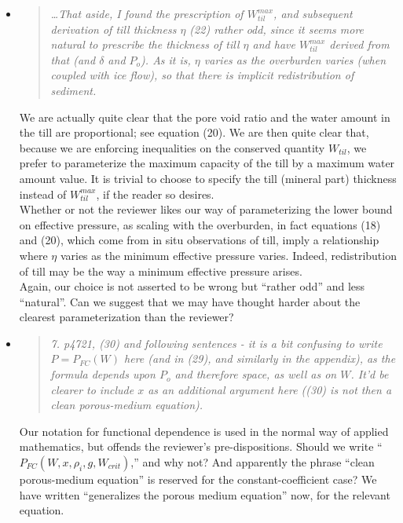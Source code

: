 \documentclass[11pt,reqno]{amsart}
\newcommand{\reply}[2]{
\medskip\medskip
\item  \begin{quote}
\emph{#1}
\end{quote}

\medskip
\noindent #2}
\begin{document}
\begin{itemize}
\reply{\dots That aside, I found the prescription of $W_{til}^{max}$, and subsequent derivation of till thickness $\eta$ (22) rather odd, since it seems more natural to prescribe the thickness of till $\eta$ and have $W_{til}^{max}$ derived from that (and $\delta$ and $P_o$).  As it is, $\eta$ varies as the overburden varies (when coupled with ice flow), so that there is implicit redistribution of sediment.}
{We are actually quite clear that the pore void ratio and the water amount in the till are proportional; see equation (20).  We are then quite clear that, because we are enforcing inequalities on the conserved quantity $W_{til}$, we prefer to parameterize the maximum capacity of the till by a maximum water amount value.  It is trivial to choose to specify the till (mineral part) thickness instead of $W_{til}^{max}$, if the reader so desires. \\
\indent Whether or not the reviewer likes our way of parameterizing the lower bound on effective pressure, as scaling with the overburden, in fact equations (18) and (20), which come from in situ observations of till, imply a relationship where $\eta$ varies as the minimum effective pressure varies.  Indeed, redistribution of till may be the way a minimum effective pressure arises. \\
\indent Again, our choice is not asserted to be wrong but ``rather odd'' and  less ``natural''.  Can we suggest that we may have thought harder about the clearest parameterization than the reviewer?}

\reply{7. p4721, (30) and following sentences - it is a bit confusing to write $P = P_{FC}(W)$ here (and in (29), and similarly in the appendix), as the formula depends upon $P_o$ and therefore space, as well as on $W$.  It'd be clearer to include $x$ as an additional argument here ((30) is not then a clean porous-medium equation).}
{Our notation for functional dependence is used in the normal way of applied mathematics, but offends the reviewer's pre-dispositions.  Should we write ``$P_{FC}(W,x,\rho_i,g,W_{crit})$,'' and why not?  And apparently the phrase ``clean porous-medium equation'' is reserved for the constant-coefficient case?  We have written ``generalizes the porous medium equation'' now, for the relevant equation.}


\end{itemize}
\end{document}
